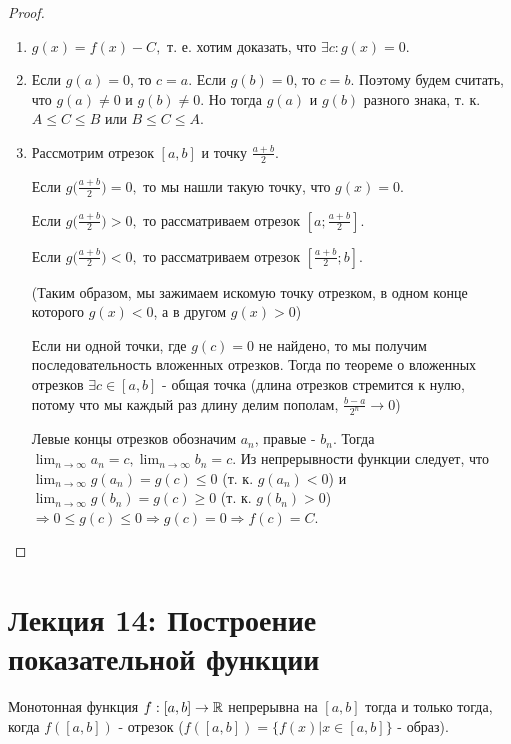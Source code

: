 	\begin{proof}
		\begin{enumerate}
			\item $g(x) = f(x) - C,$ т. е. хотим доказать, что $\exists c: g(x) = 0.$
			\item Если $g(a) = 0$, то $c = a$. Если $g(b) = 0$, то $c = b$. Поэтому будем считать, что $g(a) \neq 0$ и $g(b) \neq 0$. Но тогда  $g(a)$ и $g(b)$ разного знака, т. к. $A \leqslant C \leqslant B$ или $B \leqslant C \leqslant A$.
			\item Рассмотрим отрезок $[a, b]$ и точку $\frac{a + b}{2}$.
			
			Если $g\big(\frac{a + b}{2}\big) = 0,$ то мы нашли такую точку, что $g(x) = 0$.
			
			Если $g\big(\frac{a + b}{2}\big) > 0,$ то рассматриваем отрезок $[a; \frac{a + b}{2}]$.
			
			Если $g\big(\frac{a + b}{2}\big) < 0,$ то рассматриваем отрезок $[\frac{a + b}{2}; b]$.
			
			(Таким образом, мы зажимаем искомую точку отрезком, в одном конце которого $g(x) < 0$, а в другом $g(x) > 0$)
			
			Если ни одной точки, где $g(c) = 0$ не найдено, то мы получим последовательность вложенных отрезков. Тогда по теореме о вложенных отрезков $\exists c \in [a, b]$ - общая точка (длина отрезков стремится к нулю, потому что мы каждый раз длину делим пополам, $\frac{b - a}{2^n} \to 0$)
			
			Левые концы отрезков обозначим $a_n$, правые - $b_n$. Тогда $\lim_{n \to \infty} a_n = c, \lim_{n \to \infty} b_n = c$. Из непрерывности функции следует, что $\lim_{n \to \infty} g(a_n) = g(c) \leqslant 0$ (т. к. $g(a_n) < 0$) и $\lim_{n \to \infty} g(b_n) = g(c) \geqslant 0$ (т. к. $g(b_n) > 0$) $\Rightarrow 0 \leqslant g(c) \leqslant 0 \Rightarrow g(c) = 0 \Rightarrow f(c) = C.$
			
		\end{enumerate}
	\end{proof}
	
	\newpage
	
	\section*{Лекция 14: Построение показательной функции}
	
	\begin{theorem}
		Монотонная функция $f : [a, b] \to \mathbb R$ непрерывна на $[a, b]$ тогда и только тогда, когда $f([a, b])$ - отрезок ($f([a, b]) = \{f(x) | x \in [a, b]\}$ - образ).
	\end{theorem}
	
